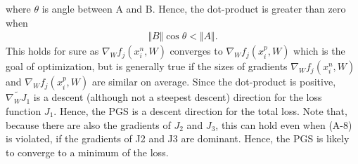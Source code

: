 \documentclass[runningheads]{llncs}
\begin{document}
  where $\theta$ is angle between A and B. 
  Hence, the dot-product is greater than zero when
  \begin{equation}
    \begin{split}
      \Vert B\Vert \cos{\theta} < \Vert A \Vert.
    \end{split}
  \end{equation}
  This holds for sure as $\nabla_W f_j(x^n_i,W)$ converges to 
  $\nabla_W f_j(x^p_i,W)$ which is the goal of optimization, but is 
  generally true if the sizes of gradients $\nabla_W f_j(x^n_i,W)$ and 
  $\nabla_W f_j(x^p_i,W)$ are similar on average. Since the dot-product is positive, $\widetilde{\nabla_W J_{1}}$  is a descent (although not a steepest descent) direction for the loss function $J_1$. Hence, the PGS is a descent direction for the total loss. Note that, because there are also the gradients of $J_2$ and $J_3$, this can hold even when (A-8) is violated, if the gradients of J2 and J3 are dominant. Hence, the PGS is likely to converge to a minimum of the loss. 
\clearpage


\clearpage
\end{document}
